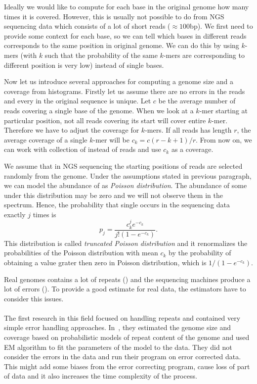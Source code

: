 Ideally we would like to compute for each base in the original genome how many times it is covered. However, this is usually not possible to do from NGS sequencing data which consists of a lot of short reads ($\approx 100$bp). We first need to provide some context for each base, so we can tell which bases in different reads corresponds to the same position in original genome. We can do this by using $k$-mers (with $k$ such that the probability of the same $k$-mers are corresponding to different position is very low)  instead of single bases.

Now let us introduce several approaches for computing a genome size and a coverage from \kmer histograms. Firstly let us assume there are no errors in the reads and every \kmer in the original sequence is unique. Let $c$ be the average number of reads covering a single base of the genome. When we look at a $k$-mer starting at particular position, not all reads covering its start will cover entire $k$-mer.
Therefore we have to adjust the coverage for $k$-mers.
If all reads has length $r$, the average coverage of a single $k$-mer will be $c_k = c (r - k + 1)/r$. From now on, we can work with collection of \kmers instead of reads and use $c_k$ as a coverage.

We assume that in NGS sequencing the starting positions of reads are selected randomly from the genome.
Under the assumptions stated in previous paragraph, we can model the abundance of \kmers as \emph{Poisson distribution}. The abundance of some \kmers under this distribution may be zero and we will not observe them in the spectrum. Hence, the probability that single \kmer occurs in the sequencing data exactly $j$ times is $$p_j = \frac{c_k^j e^{-c_k}}{j! (1-e^{-c_k})}.$$
This distribution is called \emph{truncated Poisson distribution} and it renormalizes the probabilities of the Poisson distribution with mean $c_k$ by the probability of obtaining a value grater then zero in Poisson distribution, which is $1/(1-e^{-c_k})$.

Real genomes contains a lot of repeats () and the sequencing machines produce a lot of errors (). To provide a good estimate for real data, the estimators have to consider this issues.

\paragraph{} The first research in this field focused on handling repeats and contained very simple error handling approaches. In~\cite{waterman}, they estimated the genome size and coverage based on probabilistic models of repeat content of the genome and used EM algorithm to fit the parameters of the model to the data. They did not consider the errors in the data and run their program on error corrected data. This might add some biases from the error correcting program, cause loss of part of data and it also increases the time complexity of the process.

